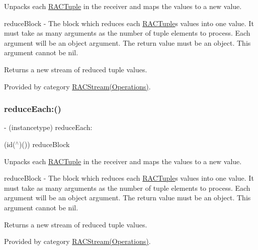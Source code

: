Unpacks each \mbox{\hyperlink{interface_r_a_c_tuple}{R\+A\+C\+Tuple}} in the receiver and maps the values to a new value.

reduce\+Block -\/ The block which reduces each \mbox{\hyperlink{interface_r_a_c_tuple}{R\+A\+C\+Tuple}}\textquotesingle{}s values into one value. It must take as many arguments as the number of tuple elements to process. Each argument will be an object argument. The return value must be an object. This argument cannot be nil.

Returns a new stream of reduced tuple values. 

Provided by category \mbox{\hyperlink{category_r_a_c_stream_07_operations_08_aaf04bf295d943b85860ae5cc3d5851ff}{R\+A\+C\+Stream(\+Operations)}}.

\mbox{\label{interface_r_a_c_stream_aaf04bf295d943b85860ae5cc3d5851ff}} 
\subsubsection{\texorpdfstring{reduce\+Each\+:()}{reduceEach:()}\hspace{0.1cm}{\footnotesize\ttfamily [3/3]}}
{\footnotesize\ttfamily -\/ (instancetype) reduce\+Each\+: \begin{DoxyParamCaption}\item[{(id($^\wedge$)())}]{reduce\+Block }\end{DoxyParamCaption}}

Unpacks each \mbox{\hyperlink{interface_r_a_c_tuple}{R\+A\+C\+Tuple}} in the receiver and maps the values to a new value.

reduce\+Block -\/ The block which reduces each \mbox{\hyperlink{interface_r_a_c_tuple}{R\+A\+C\+Tuple}}\textquotesingle{}s values into one value. It must take as many arguments as the number of tuple elements to process. Each argument will be an object argument. The return value must be an object. This argument cannot be nil.

Returns a new stream of reduced tuple values. 

Provided by category \mbox{\hyperlink{category_r_a_c_stream_07_operations_08_aaf04bf295d943b85860ae5cc3d5851ff}{R\+A\+C\+Stream(\+Operations)}}.

\mbox{\label{interface_r_a_c_stream_ab3497f3cf2f0d43e90d375dc26ed12ba}} 

